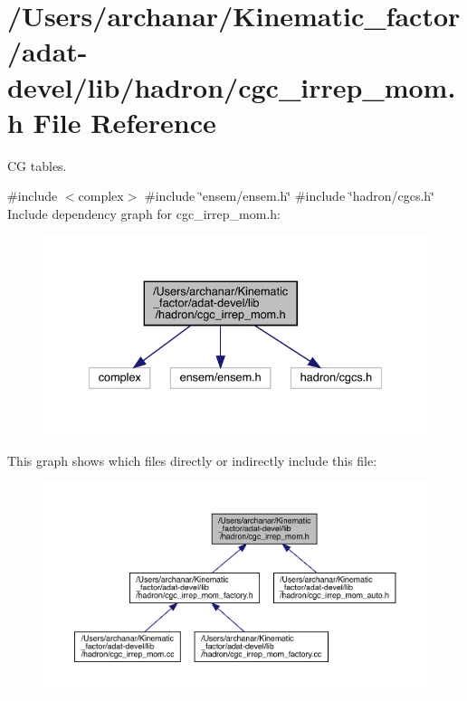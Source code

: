 \hypertarget{adat-devel_2lib_2hadron_2cgc__irrep__mom_8h}{}\section{/\+Users/archanar/\+Kinematic\+\_\+factor/adat-\/devel/lib/hadron/cgc\+\_\+irrep\+\_\+mom.h File Reference}
\label{adat-devel_2lib_2hadron_2cgc__irrep__mom_8h}


CG tables.  


{\ttfamily \#include $<$complex$>$}\newline
{\ttfamily \#include \char`\"{}ensem/ensem.\+h\char`\"{}}\newline
{\ttfamily \#include \char`\"{}hadron/cgcs.\+h\char`\"{}}\newline
Include dependency graph for cgc\+\_\+irrep\+\_\+mom.\+h\+:
\nopagebreak
\begin{figure}[H]
\begin{center}
\leavevmode
\includegraphics[width=335pt]{d7/d27/adat-devel_2lib_2hadron_2cgc__irrep__mom_8h__incl}
\end{center}
\end{figure}
This graph shows which files directly or indirectly include this file\+:
\nopagebreak
\begin{figure}[H]
\begin{center}
\leavevmode
\includegraphics[width=350pt]{d3/dbe/adat-devel_2lib_2hadron_2cgc__irrep__mom_8h__dep__incl}
\end{center}
\end{figure}
